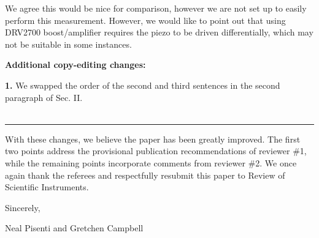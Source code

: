 \documentclass[12pt, oneside]{letter}   	%
\begin{document}
We agree this would be nice for comparison, however we are not set up to easily perform this measurement.
However, we would like to point out that using DRV2700 boost/amplifier requires the piezo to be driven differentially, which may not be suitable in some instances.

\textbf{Additional copy-editing changes:}

\textbf{1.} We swapped the order of the second and third sentences in the second paragraph of Sec. II.
\\\\
\hrule
\newpage

With these changes, we believe the paper has been greatly improved.
The first two points address the provisional publication recommendations of reviewer \#1, while the remaining points incorporate comments from reviewer \#2.
We once again thank the referees and respectfully resubmit this paper to Review of Scientific Instruments.

Sincerely,

Neal Pisenti and Gretchen Campbell
\end{document}
